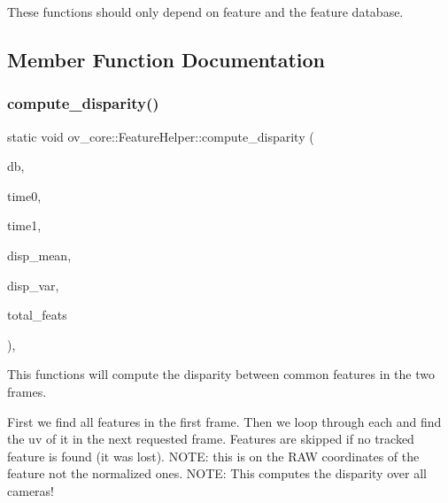 These functions should only depend on feature and the feature database. 

\subsection{Member Function Documentation}
\mbox{\label{classov__core_1_1FeatureHelper_a1371c7d11c6d74693f7cec9deea2afcd}} 
\subsubsection{\texorpdfstring{compute\+\_\+disparity()}{compute\_disparity()}\hspace{0.1cm}{\footnotesize\ttfamily [1/2]}}
{\footnotesize\ttfamily static void ov\+\_\+core\+::\+Feature\+Helper\+::compute\+\_\+disparity (\begin{DoxyParamCaption}\item[{std\+::shared\+\_\+ptr$<$ \hyperlink{classov__core_1_1FeatureDatabase}{ov\+\_\+core\+::\+Feature\+Database} $>$}]{db,  }\item[{double}]{time0,  }\item[{double}]{time1,  }\item[{double \&}]{disp\+\_\+mean,  }\item[{double \&}]{disp\+\_\+var,  }\item[{int \&}]{total\+\_\+feats }\end{DoxyParamCaption})\hspace{0.3cm}{\ttfamily [inline]}, {\ttfamily [static]}}



This functions will compute the disparity between common features in the two frames. 

First we find all features in the first frame. Then we loop through each and find the uv of it in the next requested frame. Features are skipped if no tracked feature is found (it was lost). N\+O\+TE\+: this is on the R\+AW coordinates of the feature not the normalized ones. N\+O\+TE\+: This computes the disparity over all cameras!


